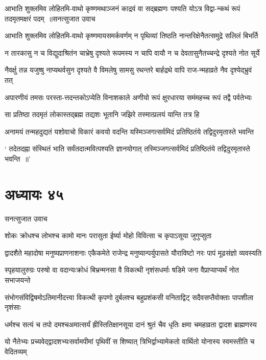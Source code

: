 \threelineshloka
{आभाति शुक्लमिव लोहितमि-वाथो कृष्णमथाञ्जनं काद्रवं वा}
{सद्ब्रह्मणः पश्यति योऽत्र विद्वा-न्कथं रूपं तदमृतमक्षरं पदम् ॥सनत्सुजात उवाच}
{}


\twolineshloka
{आभाति शुक्लमिव लोहितमि-वाथो कृष्णमायसमर्कवर्णम्}
{न पृथिव्यां तिष्ठति नान्तरिक्षेनैतत्समुद्रे सलिलं बिभर्ति}


\twolineshloka
{न तारकासु न च विद्युदाश्रितंन चाभ्रेषु दृश्यते रूपमस्य}
{न चापि वायौ न च देवतासुनैतच्चन्द्रे दृश्यते नोत सूर्ये}


\twolineshloka
{नैवर्क्षु तन्न यजुष्षु नाप्यथर्वसुन दृश्यते वै विमलेषु सामसु}
{रथन्तरे बार्हद्रथे वापि राज-न्महाव्रते नैव दृश्येद्भ्रुवं तत्}


\twolineshloka
{अपारणीयं तमसः परस्ता-त्तदन्तकोऽप्येति विनाशकाले}
{अणीयो रूपं क्षुरधारया समंमहच्च रूपं तद्वै पर्वतेभ्यः}


\twolineshloka
{सा प्रतिष्ठा तदमृतं लोकास्तद्ब्रह्म तद्यशः}
{भूतानि जझिरे तस्मात्प्रलयं यान्ति तत्र हि}


\twolineshloka
{अनामयं तन्महदुद्यतं यशोवाचो विकारं कवयो वदन्ति}
{यस्मिञ्जगत्सर्वमिदं प्रतिष्ठितंये तद्विदुरमृतास्ते भवन्ति}


\twolineshloka
{` तदेतदह्ना संस्थितं भाति सर्वंतदात्मवित्पश्यति ज्ञानयोगात्}
{तस्मिञ्जगत्सर्वमिदं प्रतिष्ठितंये तद्विदुरमृतास्ते भवन्ति ॥'}


\chapter{अध्यायः ४५}
\twolineshloka
{सनत्सुजात उवाच}
{}


\twolineshloka
{शोकः क्रोधश्च लोभश्च कामो मानः परासुता}
{ईर्ष्या मोहो विवित्सा च कृपाऽसूया जुगुप्सुता}


\threelineshloka
{द्वादशैते महादोषा मनुष्यप्राणनाशनाः}
{एकैकमेते राजेन्द्र मनुष्यान्पर्युपासते}
{यौराविष्टो नरः पापं मूढसंज्ञो व्यवस्यति}


\twolineshloka
{स्पृहयालुरुग्रः परुषो वा वदान्यःक्रोधं बिभ्रन्मनसा वै विकत्थी}
{नृशंसधर्माः षडिमे जना वैप्राप्याप्यर्थं नोत सभाजयन्ते}


\twolineshloka
{संभोगसंविद्विषमोऽतिमानीदत्त्वा विकत्थी कृपणो दुर्बलश्च}
{बहुप्रशंकसी वनिताद्विट् सदैवसप्तैवोक्ताः पापशीला नृशंसाः}


\twolineshloka
{धर्मश्च सत्यं च तपो दमश्चअमात्सर्यं ह्रीस्तितिक्षानसूया}
{दानं श्रुतं चैव धृतिः क्षमा चमहाव्रता द्वादश ब्राह्मणस्य}


\twolineshloka
{यो नैतेभ्यः प्रच्यवेद्द्वादशभ्यःसर्वामपीमां पृथिवीं स शिष्यात्}
{त्रिभिर्द्वाभ्यामेकतो वार्थितो योनास्य स्वमस्तीति च वेदितव्यम्}


